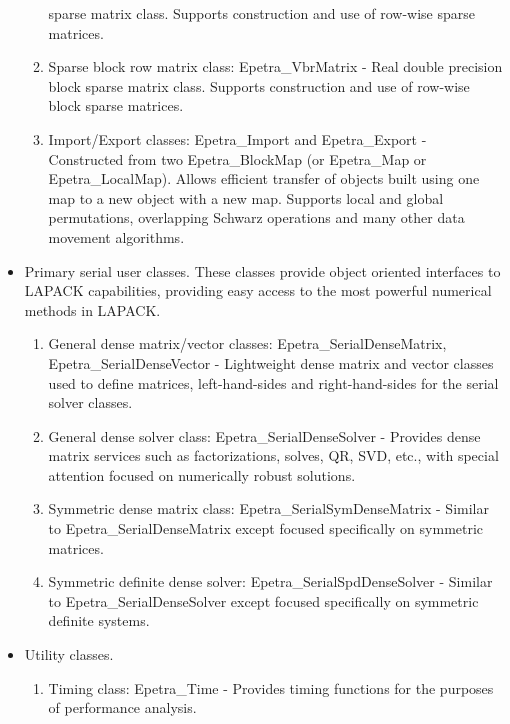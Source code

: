 \begin{itemize}
\begin{enumerate}
  sparse matrix class.  Supports construction and use of row-wise sparse
  matrices.
\item Sparse block row matrix class: Epetra\_VbrMatrix - Real double
  precision block sparse matrix class.  Supports construction and use of
  row-wise block sparse matrices.
\item Import/Export classes: Epetra\_Import and Epetra\_Export -
  Constructed from two Epetra\_BlockMap (or Epetra\_Map or
  Epetra\_LocalMap).  Allows efficient transfer of objects built using
  one map to a new object with a new map.  Supports local and global
  permutations, overlapping Schwarz operations and many other data
  movement algorithms.
\end{enumerate}     

\item Primary serial user classes.  These classes provide object
  oriented interfaces to LAPACK capabilities, providing easy access to
  the most powerful numerical methods in LAPACK.
\begin{enumerate}
\item General dense matrix/vector classes: Epetra\_SerialDenseMatrix,
  Epetra\_SerialDenseVector - Lightweight dense matrix and vector classes
  used to define matrices, left-hand-sides and right-hand-sides for the
  serial solver classes.
\item General dense solver class: Epetra\_SerialDenseSolver - Provides
  dense matrix services such as factorizations, solves, QR, SVD, etc.,
  with special attention focused on numerically robust solutions.
\item Symmetric dense matrix class: Epetra\_SerialSymDenseMatrix -
  Similar to Epetra\_SerialDenseMatrix except focused specifically on
  symmetric matrices.
\item Symmetric definite dense solver: Epetra\_SerialSpdDenseSolver -
  Similar to Epetra\_SerialDenseSolver except focused specifically on
  symmetric definite systems.
\end{enumerate}

\item Utility classes. 

\begin{enumerate}
\item Timing class: Epetra\_Time - Provides timing functions for the
  purposes of performance analysis.
  

\end{enumerate}
\end{itemize}
